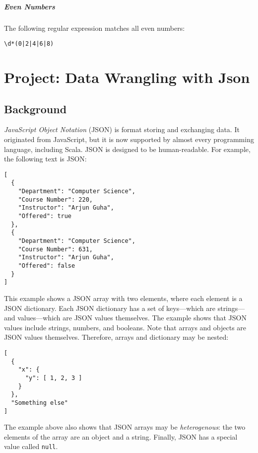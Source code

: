 \documentclass[9pt]{extbook}
\begin{document}
\paragraph{Even Numbers}

The following regular expression matches all even numbers:

\begin{verbatim}
\d*(0|2|4|6|8)
\end{verbatim}























\chapter{Project: Data Wrangling with Json}

\section{Background}

\emph{JavaScript Object Notation} (JSON) is format storing and
exchanging data. It originated from JavaScript, but it is now supported by
almost every programming language, including Scala. JSON is designed
to be human-readable. For example, the following text is JSON:
%
\lstset{language=console}
\begin{lstlisting}
[
  {
    "Department": "Computer Science",
    "Course Number": 220,
    "Instructor": "Arjun Guha",
    "Offered": true
  },
  {
    "Department": "Computer Science",
    "Course Number": 631,
    "Instructor": "Arjun Guha",
    "Offered": false
  }
]
\end{lstlisting}
%
This example shows a JSON array with two elements, where each element is a
JSON dictionary. Each JSON dictionary has a set of keys---which are strings---and
values---which are JSON values themselves. The example shows that JSON values include
strings, numbers, and booleans. Note that arrays and objects are JSON values
themselves. Therefore, arrays and dictionary may be nested:
\lstset{language=console}
\begin{lstlisting}
[
  {
    "x": {
      "y": [ 1, 2, 3 ]
    }
  },
  "Something else"
]
\end{lstlisting}
%
The example above also shows that JSON arrays may be \emph{heterogenous}:
the two elements of the array are an object and a string.
Finally, JSON has a special value called \lstinline|null|.
\end{document}
